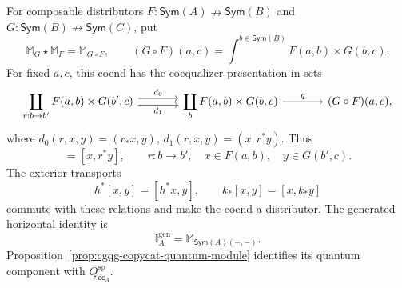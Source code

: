 \documentclass[oneside]{article}
\newcommand{\Sym}{\mathsf{Sym}}
\newcommand{\cc}{\mathsf{cc}}
\newcommand{\xnrightarrow}[1]{\mathrel{\overset{#1}{\nrightarrow}}}
\theoremstyle{plain}
\theoremstyle{definition}
\theoremstyle{remark}
\begin{document}
For composable distributors \(F:\Sym(A)\xnrightarrow{}\Sym(B)\) and
\(G:\Sym(B)\xnrightarrow{}\Sym(C)\), put
\begin{equation}
 \mathbb M_G\star\mathbb M_F=\mathbb M_{G\circ F},
 \qquad
 (G\circ F)(a,c)=\int^{b\in \Sym(B)}F(a,b)\times G(b,c).
 \label{eq:cgqg-generated-horizontal-composition}
\end{equation}
For fixed \(a,c\), this coend has the coequalizer presentation in sets
\[
 \begin{tikzcd}[column sep=large,row sep=large]
 \displaystyle\coprod_{r:b\to b'}F(a,b)\times G(b',c)
   \arrow[r,shift left=.7ex,"d_0"]
   \arrow[r,shift right=.7ex,"d_1"']
   &\displaystyle\coprod_b F(a,b)\times G(b,c)
       \arrow[r,"q"]&(G\circ F)(a,c),
 \end{tikzcd}
\]
where \(d_0(r,x,y)=(r_*x,y)\), \(d_1(r,x,y)=(x,r^*y)\). Thus
\begin{equation}
 [r_*x,y]=[x,r^*y],
 \qquad r:b\to b',\quad x\in F(a,b),\quad y\in G(b',c).
 \label{eq:cgqg-full-coend-relation}
\end{equation}
The exterior transports
\[
 h^*[x,y]=[h^*x,y],\qquad k_*[x,y]=[x,k_*y]
\]
commute with these relations and make the coend a distributor.
The generated horizontal identity is
\begin{equation}
 \mathbb I_A^{\mathrm{gen}}=\mathbb M_{\Sym(A)(-,-)}.
 \label{eq:cgqg-generated-horizontal-unit}
\end{equation}
Proposition~\ref{prop:cgqg-copycat-quantum-module} identifies its quantum
component with \(Q_{\cc_A}^{\mathrm{sp}}\).
\end{document}
